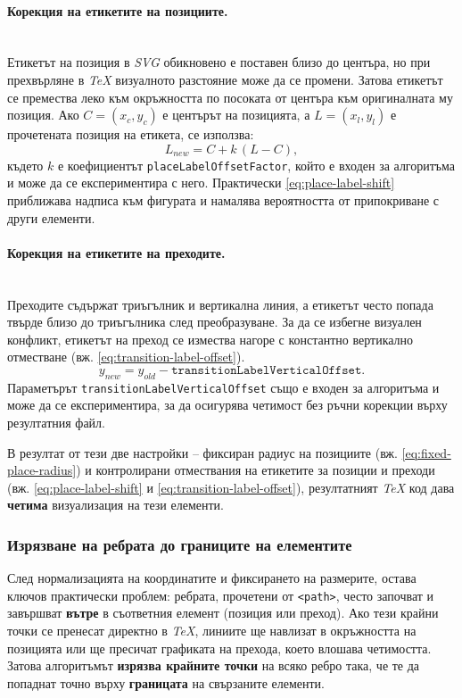 \paragraph{Корекция на етикетите на позициите.}
\mbox{}\\
Етикетът на позиция в \textit{SVG} обикновено е поставен близо до центъра, но при прехвърляне в \textit{TeX} визуалното разстояние може да се промени. Затова етикетът се премества леко към окръжността по посоката от центъра към оригиналната му позиция. Ако \(C=(x_c,y_c)\) е центърът на позицията, а \(L=(x_l,y_l)\) е прочетената позиция на етикета, се използва:
\begin{equation}
L_{\textit{new}} = C + k\,(L-C),
\label{eq:place-label-shift}
\end{equation}
където $k$ е коефициентът \texttt{placeLabelOffsetFactor}, който е входен за алгоритъма и може да се експериментира с него. Практически \eqref{eq:place-label-shift} приближава надписа към фигурата и намалява вероятността от припокриване с други елементи.

\paragraph{Корекция на етикетите на преходите.}
\mbox{}\\
Преходите съдържат триъгълник и вертикална линия, а етикетът често попада твърде близо до триъгълника след преобразуване. За да се избегне визуален конфликт, етикетът на преход се измества нагоре с константно вертикално отместване (вж. \eqref{eq:transition-label-offset}).
\begin{equation}
y_{\textit{new}} = y_{\textit{old}} - \texttt{transitionLabelVerticalOffset}.
\label{eq:transition-label-offset}
\end{equation}
Параметърът \texttt{transitionLabelVerticalOffset} също е входен за алгоритъма и може да се експериментира, за да осигурява четимост без ръчни корекции върху резултатния файл.

В резултат от тези две настройки -- фиксиран радиус на позициите (вж. \eqref{eq:fixed-place-radius}) и контролирани отмествания на етикетите за позиции и преходи (вж. \eqref{eq:place-label-shift} и \eqref{eq:transition-label-offset}), резултатният \textit{TeX} код дава \textbf{четима} визуализация на тези елементи.

\subsubsection{Изрязване на ребрата до границите на елементите}
\hspace*{2.5em}След нормализацията на координатите и фиксирането на размерите, остава ключов практически проблем: ребрата, прочетени от \texttt{<path>}, често започват и завършват \textbf{вътре} в съответния елемент (позиция или преход). Ако тези крайни точки се пренесат директно в \textit{TeX}, линиите ще навлизат в окръжността на позицията или ще пресичат графиката на прехода, което влошава четимостта. Затова алгоритъмът \textbf{изрязва крайните точки} на всяко ребро така, че те да попаднат точно върху \textbf{границата} на свързаните елементи.

